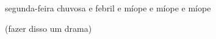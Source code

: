 \begin{poem}
\begin{stanza}
segunda-feira chuvosa e febril\verseline
\qquad e míope\verseline
\qquad e míope\verseline
\qquad e míope
\end{stanza}
\begin{stanza}
(fazer disso um drama)
\end{stanza}
\end{poem}